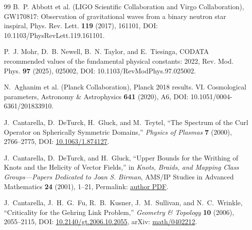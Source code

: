 \documentclass[11pt]{article}
\theoremstyle{definition}
\theoremstyle{plain}
\theoremstyle{remark}
\begin{document}
\begin{thebibliography}{99}
            B.~P. Abbott et al. (LIGO Scientific Collaboration and Virgo Collaboration),
            \newblock GW170817: Observation of gravitational waves from a binary neutron star inspiral,
            \newblock Phys. Rev. Lett. \textbf{119} (2017), 161101,
            \newblock DOI: 10.1103/PhysRevLett.119.161101.

            P.~J. Mohr, D.~B. Newell, B.~N. Taylor, and E.~Tiesinga,
            \newblock CODATA recommended values of the fundamental physical constants: 2022,
            \newblock Rev. Mod. Phys. \textbf{97} (2025), 025002,
            \newblock DOI: 10.1103/RevModPhys.97.025002.

            N.~Aghanim et al. (Planck Collaboration),
            \newblock Planck 2018 results. VI. Cosmological parameters,
            \newblock Astronomy \& Astrophysics \textbf{641} (2020), A6,
            \newblock DOI: 10.1051/0004-6361/201833910.

            J.~Cantarella, D.~DeTurck, H.~Gluck, and M.~Teytel,
            \newblock ``The Spectrum of the Curl Operator on Spherically Symmetric Domains,''
            \newblock \emph{Physics of Plasmas} \textbf{7} (2000), 2766--2775,
            \newblock DOI: \href{https://doi.org/10.1063/1.874127}{10.1063/1.874127}.

            J.~Cantarella, D.~DeTurck, and H.~Gluck,
            \newblock ``Upper Bounds for the Writhing of Knots and the Helicity of Vector Fields,''
            \newblock in \emph{Knots, Braids, and Mapping Class Groups---Papers Dedicated to Joan S. Birman},
            AMS/IP Studies in Advanced Mathematics \textbf{24} (2001), 1--21,
            \newblock Permalink: \href{https://jasoncantarella.com/downloads/papers/upperbounds/upperbounds.pdf}{author PDF}.

            J.~Cantarella, J.~H.~G.~Fu, R.~B.~Kusner, J.~M.~Sullivan, and N.~C.~Wrinkle,
            \newblock ``Criticality for the Gehring Link Problem,''
            \newblock \emph{Geometry \& Topology} \textbf{10} (2006), 2055--2115,
            \newblock DOI: \href{https://doi.org/10.2140/gt.2006.10.2055}{10.2140/gt.2006.10.2055},
            \newblock arXiv: \href{https://arxiv.org/abs/math/0402212}{math/0402212}.


\end{thebibliography}
\end{document}
